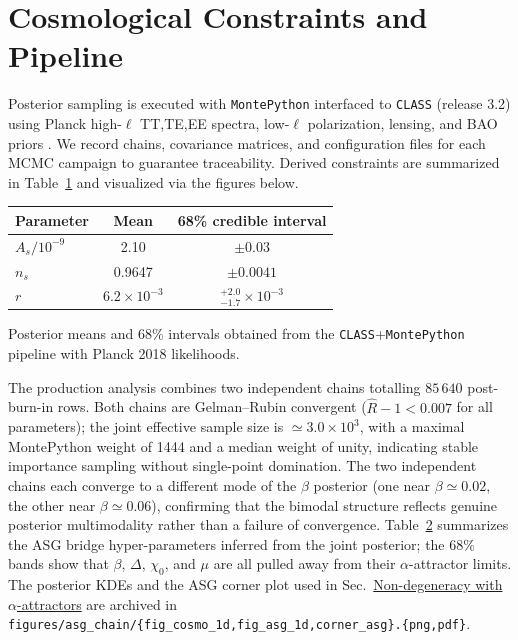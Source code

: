 \documentclass[
]{article}
\newcounter{none} %
\begin{document}
\section{Cosmological Constraints and
Pipeline}\label{cosmological-constraints-and-pipeline}

Posterior sampling is executed with \texttt{MontePython} interfaced to
\texttt{CLASS} (release 3.2) using Planck high-\(\ell\) TT,TE,EE
spectra, low-\(\ell\) polarization, lensing, and BAO priors . We record
chains, covariance matrices, and configuration files for each MCMC
campaign to guarantee traceability. Derived constraints are summarized
in Table~\hyperref[tab:constraints]{1} and visualized via the figures
below.

{\def\LTcaptype{none} %
\begin{longtable}[]{@{}lcc@{}}
\toprule\noalign{}
Parameter & Mean & 68\% credible interval \\
\midrule\noalign{}
\endhead
\bottomrule\noalign{}
\endlastfoot
\(A_{s}/10^{- 9}\) & 2.10 & \(\pm 0.03\) \\
\(n_{s}\) & 0.9647 & \(\pm 0.0041\) \\
\(r\) & \(6.2 \times 10^{- 3}\) &
\(_{- 1.7}^{+ 2.0} \times 10^{- 3}\) \\
\end{longtable}
}

Posterior means and \(68\%\) intervals obtained from the
\texttt{CLASS}+\texttt{MontePython} pipeline with Planck 2018
likelihoods.

The production analysis combines two independent chains totalling
\(85\,640\) post-burn-in rows. Both chains are Gelman--Rubin convergent
(\(\hat{R}-1 < 0.007\) for all parameters); the joint effective sample
size is \(\simeq 3.0\times 10^{3}\), with a maximal MontePython weight
of 1444 and a median weight of unity, indicating stable importance
sampling without single-point domination. The two independent chains
each converge to a different mode of the \(\beta\) posterior (one near
\(\beta\simeq 0.02\), the other near \(\beta\simeq 0.06\)), confirming
that the bimodal structure reflects genuine posterior multimodality
rather than a failure of convergence.
Table~\hyperref[tab:asg-hyper]{2} summarizes the ASG bridge
hyper-parameters inferred from the joint posterior; the \(68\%\)
bands show that \(\beta\), \(\Delta\), \(\chi_{0}\), and \(\mu\) are all
pulled away from their \(\alpha\)-attractor limits. The posterior KDEs
and the ASG corner plot used in
Sec.~\hyperref[non-degeneracy-with-alpha-attractors]{Non-degeneracy with
\(\alpha\)-attractors} are archived in
\texttt{figures/asg\_chain/\{fig\_cosmo\_1d,fig\_asg\_1d,corner\_asg\}.\{png,pdf\}}.
\end{document}
